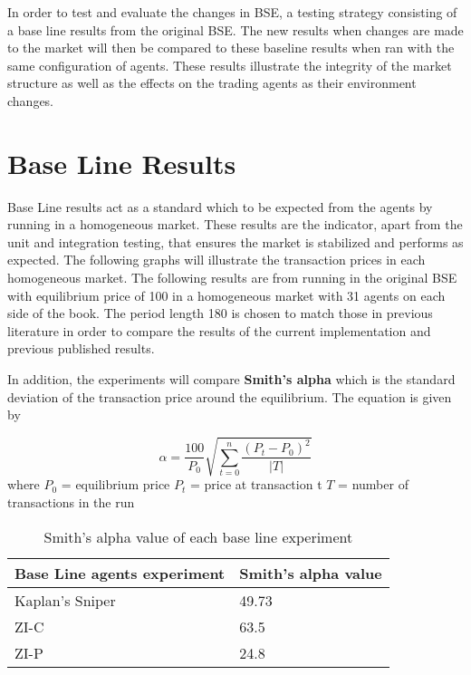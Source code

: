 In order to test and evaluate the changes in BSE, a testing strategy consisting of a base line results from the original BSE. The new results when changes are made to the market will then be compared to these baseline results when ran with the same configuration of agents. These results illustrate the integrity of the market structure as well as the effects on the trading agents as their environment changes. 

\section{Base Line Results} 
Base Line results act as a standard which to be expected from the agents by running in a homogeneous market. These results are the indicator, apart from the unit and integration testing, that ensures the market is stabilized and performs as expected. The following graphs will illustrate the transaction prices in each homogeneous market. The following results are from running in the original BSE with equilibrium price of 100 in a homogeneous market with 31 agents on each side of the book. The period length 180 is chosen to match those in previous literature in order to compare the results of the current implementation and previous published results. 

In addition, the experiments will compare \textbf{Smith's alpha} which is the standard deviation of the transaction price around the equilibrium. The equation is given by 

\begin{equation}
\alpha = \frac{100}{P_0}\sqrt{\sum_{t=0}^{n} \frac{(P_t - P_0)^2}{|T|} }
\end{equation}
where $P_0$ = equilibrium price 
\newline $P_t$ = price at transaction t 
\newline $T$ = number of transactions in the run

\begin{table}[h]
\centering
\begin{tabular}{ |m||p{4cm}|} 
\hline
\textbf{Base Line agents experiment}& \textbf{Smith's alpha value} \\
\hline
\hline
Kaplan's Sniper & 49.73 \\ 
\hline
ZI-C & 63.5\\ 
\hline
ZI-P & 24.8 \\ 
\hline
\end{tabular}
\caption{Smith's alpha value of each base line experiment}  
\end{table}
\FloatBarrier

